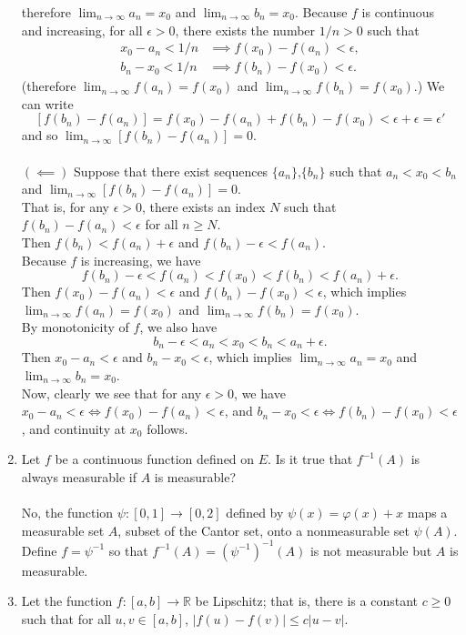 \begin{enumerate}
	therefore $\lim_{n\to\infty} a_n = x_0$ and $\lim_{n\to\infty} b_n = x_0$.
	Because $f$ is continuous and increasing, for all $\epsilon>0$, there exists the number $1/n>0$ such that
	\begin{align*}
	x_0-a_n<1/n&\implies f(x_0)-f(a_n)<\epsilon,\\
	b_n-x_0<1/n&\implies f(b_n)-f(x_0)<\epsilon.
	\end{align*}
	(therefore $\lim_{n\to\infty} f(a_n) = f(x_0)$ and $\lim_{n\to\infty} f(b_n) = f(x_0)$.) We can write
	\[
		[f(b_n)-f(a_n)]=f(x_0)-f(a_n)+f(b_n)-f(x_0) <\epsilon+\epsilon=\epsilon'
	\]
	and so $\lim_{n\to\infty}[f(b_n)-f(a_n)]=0$.\\
	\\$(\impliedby)$ Suppose that there exist sequences $\{a_n\}$,$\{b_n\}$ such that $a_n<x_0<b_n$ and $\lim_{n\to\infty}[f(b_n)-f(a_n)]=0$.\\
	That is, for any $\epsilon>0$, there exists an index $N$ such that $f(b_n)-f(a_n)<\epsilon$ for all $n\ge N$.
	\\Then $f(b_n)<f(a_n)+\epsilon$ and $f(b_n)-\epsilon<f(a_n)$.\\
	Because $f$ is increasing, we have \[f(b_n)-\epsilon<f(a_n)<f(x_0)<f(b_n)<f(a_n)+\epsilon.\]
	Then $f(x_0)-f(a_n)<\epsilon$ and $f(b_n)-f(x_0)<\epsilon$, which implies $\lim_{n\to\infty} f(a_n) = f(x_0)$ and $\lim_{n\to\infty} f(b_n) = f(x_0)$.\\
	By monotonicity of $f$, we also have \[b_n-\epsilon<a_n<x_0<b_n<a_n+\epsilon.\]
	Then $x_0-a_n<\epsilon$ and $b_n-x_0<\epsilon$, which implies $\lim_{n\to\infty} a_n= x_0$ and $\lim_{n\to\infty} b_n = x_0$.\\
	Now, clearly we see that for any $\epsilon>0$, we have $x_0-a_n<\epsilon\iff f(x_0)-f(a_n)<\epsilon$, and $b_n-x_0<\epsilon\iff f(b_n)-f(x_0)<\epsilon$, and continuity at $x_0$ follows.
	\item Let $f$ be a continuous function defined on $E$. Is it true that $f^{-1}(A)$ is always measurable if $A$ is measurable?\\
	\\No, the function $\psi:[0,1]\to[0,2]$ defined by $\psi(x)=\varphi(x)+x$ maps a measurable set $A$, subset of the Cantor set, onto a nonmeasurable set $\psi(A)$. Define $f=\psi^{-1}$ so that $f^{-1}(A)=(\psi^{-1})^{-1}(A)$ is not measurable but $A$ is measurable.
	\item Let the function $f:[a,b]\to\mathbb{R}$ be Lipschitz; that is, there is a constant $c\ge0$ such that for all $u,v\in[a,b]$, $|f(u)-f(v)|\le c|u-v|$.

\end{enumerate}
